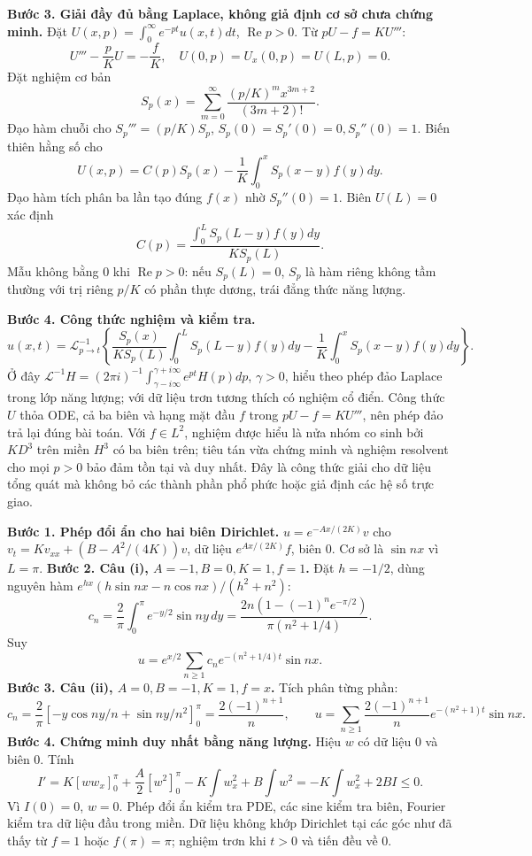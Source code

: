 \textbf{Bước 3. Giải đầy đủ bằng Laplace, không giả định cơ sở chưa chứng minh.}
Đặt $U(x,p)=\int_0^\infty e^{-pt}u(x,t)dt$, $\operatorname{Re}p>0$. Từ $pU-f=KU'''$:
\[U'''-\frac pK U=-\frac fK,\quad U(0,p)=U_x(0,p)=U(L,p)=0.\]
Đặt nghiệm cơ bản
\[S_p(x)=\sum_{m=0}^\infty\frac{(p/K)^m x^{3m+2}}{(3m+2)!}.\]
Đạo hàm chuỗi cho $S_p'''=(p/K)S_p$, $S_p(0)=S_p'(0)=0,S_p''(0)=1$. Biến thiên hằng số cho
\[U(x,p)=C(p)S_p(x)-\frac1K\int_0^xS_p(x-y)f(y)dy.\]
Đạo hàm tích phân ba lần tạo đúng $f(x)$ nhờ $S_p''(0)=1$. Biên $U(L)=0$ xác định
\[C(p)=\frac{\int_0^LS_p(L-y)f(y)dy}{KS_p(L)}.\]
Mẫu không bằng $0$ khi $\operatorname{Re}p>0$: nếu $S_p(L)=0$, $S_p$ là hàm riêng không tầm thường với trị riêng $p/K$ có phần thực dương, trái đẳng thức năng lượng.

\textbf{Bước 4. Công thức nghiệm và kiểm tra.}
\[
u(x,t)=\mathcal L^{-1}_{p\to t}
\left\{\frac{S_p(x)}{KS_p(L)}\int_0^LS_p(L-y)f(y)dy
-\frac1K\int_0^xS_p(x-y)f(y)dy\right\}.
\]
Ở đây $\mathcal L^{-1}H=(2\pi i)^{-1}\int_{\gamma-i\infty}^{\gamma+i\infty}e^{pt}H(p)dp$, $\gamma>0$, hiểu theo phép đảo Laplace trong lớp năng lượng; với dữ liệu trơn tương thích có nghiệm cổ điển. Công thức $U$ thỏa ODE, cả ba biên và hạng mặt đầu $f$ trong $pU-f=KU'''$, nên phép đảo trả lại đúng bài toán. Với $f\in L^2$, nghiệm được hiểu là nửa nhóm co sinh bởi $KD^3$ trên miền $H^3$ có ba biên trên; tiêu tán vừa chứng minh và nghiệm resolvent cho mọi $p>0$ bảo đảm tồn tại và duy nhất. Đây là công thức giải cho dữ liệu tổng quát mà không bỏ các thành phần phổ phức hoặc giả định các hệ số trực giao.

\textbf{Bước 1. Phép đổi ẩn cho hai biên Dirichlet.}
$u=e^{-Ax/(2K)}v$ cho $v_t=Kv_{xx}+(B-A^2/(4K))v$, dữ liệu $e^{Ax/(2K)}f$, biên $0$. Cơ sở là $\sin nx$ vì $L=\pi$.
\textbf{Bước 2. Câu (i), $A=-1,B=0,K=1,f=1$.}
Đặt $h=-1/2$, dùng nguyên hàm $e^{hx}(h\sin nx-n\cos nx)/(h^2+n^2)$:
\[c_n=\frac2\pi\int_0^\pi e^{-y/2}\sin ny\,dy
=\frac{2n(1-(-1)^ne^{-\pi/2})}{\pi(n^2+1/4)}.\]
Suy
\[u=e^{x/2}\sum_{n\ge1}c_ne^{-(n^2+1/4)t}\sin nx.\]
\textbf{Bước 3. Câu (ii), $A=0,B=-1,K=1,f=x$.}
Tích phân từng phần:
\[c_n=\frac2\pi[-y\cos ny/n+\sin ny/n^2]_0^\pi
=\frac{2(-1)^{n+1}}n,\qquad
u=\sum_{n\ge1}\frac{2(-1)^{n+1}}n e^{-(n^2+1)t}\sin nx.\]
\textbf{Bước 4. Chứng minh duy nhất bằng năng lượng.}
Hiệu $w$ có dữ liệu $0$ và biên $0$. Tính
\[I'=K[ww_x]_0^\pi+\frac A2[w^2]_0^\pi-K\int w_x^2+B\int w^2
=-K\int w_x^2+2BI\le0.\]
Vì $I(0)=0$, $w=0$. Phép đổi ẩn kiểm tra PDE, các sine kiểm tra biên, Fourier kiểm tra dữ liệu đầu trong miền. Dữ liệu không khớp Dirichlet tại các góc như đã thấy từ $f=1$ hoặc $f(\pi)=\pi$; nghiệm trơn khi $t>0$ và tiến đều về $0$.

